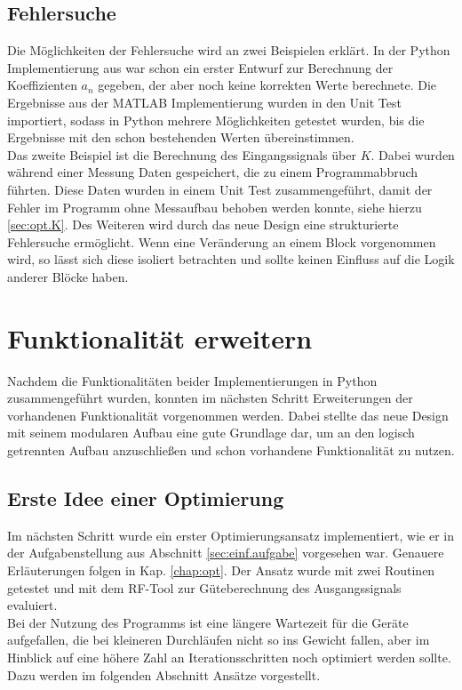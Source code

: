 \documentclass[../Report.tex]{subfiles}
\begin{document}
\subsection*{Fehlersuche}
\label{sec:vorg.fehlersuche}
Die Möglichkeiten der Fehlersuche wird an zwei Beispielen erklärt. In der Python Implementierung aus \cite{PJS_Denys} war schon ein erster Entwurf zur Berechnung der Koeffizienten $a_n$ gegeben, der aber noch keine korrekten Werte berechnete. Die Ergebnisse aus der MATLAB Implementierung wurden in den Unit Test importiert, sodass in Python mehrere Möglichkeiten getestet wurden, bis die Ergebnisse mit den schon bestehenden Werten übereinstimmen. \\
Das zweite Beispiel ist die Berechnung des Eingangssignals über $K$. Dabei wurden während einer Messung Daten gespeichert, die zu einem Programmabbruch führten. Diese Daten wurden in einem Unit Test zusammengeführt, damit der Fehler im Programm ohne Messaufbau behoben werden konnte, siehe hierzu \ref{sec:opt.K}.
Des Weiteren wird durch das neue Design eine strukturierte Fehlersuche ermöglicht. Wenn eine Veränderung an einem Block vorgenommen wird, so lässt sich diese isoliert betrachten und sollte keinen Einfluss auf die Logik anderer Blöcke haben.

\section[Funktionalität erweitern]{Funktionalität erweitern}
\label{sec:vorg.erweiterung}
Nachdem die Funktionalitäten beider Implementierungen in Python zusammengeführt wurden, konnten im nächsten Schritt Erweiterungen der vorhandenen Funktionalität vorgenommen werden. Dabei stellte das neue Design mit seinem modularen Aufbau eine gute Grundlage dar, um an den logisch getrennten Aufbau anzuschließen und schon vorhandene Funktionalität zu nutzen.
\subsection{Erste Idee einer Optimierung}
\label{sec:vorg.optimierung}
Im nächsten Schritt wurde ein erster Optimierungsansatz implementiert, wie er in der Aufgabenstellung aus Abschnitt \ref{sec:einf.aufgabe} vorgesehen war. Genauere Erläuterungen folgen in Kap. \ref{chap:opt}. Der Ansatz wurde mit zwei Routinen getestet und mit dem RF-Tool \cite{RF-Tool} zur Güteberechnung des Ausgangssignals evaluiert. \\
Bei der Nutzung des Programms ist eine längere Wartezeit für die Geräte aufgefallen, die bei kleineren Durchläufen nicht so ins Gewicht fallen, aber im Hinblick auf eine höhere Zahl an Iterationsschritten noch optimiert werden sollte. Dazu werden im folgenden Abschnitt Ansätze vorgestellt.
\end{document}

